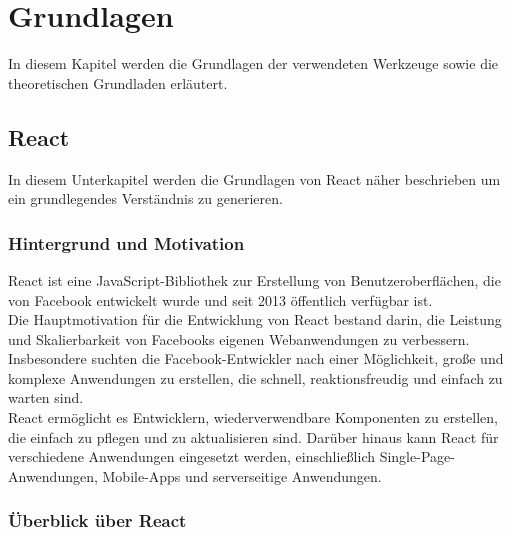 



\chapter{Grundlagen}
In diesem Kapitel werden die Grundlagen der verwendeten Werkzeuge sowie die theoretischen Grundladen erläutert.
\section{React}
In diesem Unterkapitel werden die Grundlagen von React näher beschrieben um ein grundlegendes Verständnis zu generieren.

\subsection{Hintergrund und Motivation}
React ist eine JavaScript-Bibliothek zur Erstellung von Benutzeroberflächen, die von Facebook entwickelt wurde und seit 2013 öffentlich verfügbar ist.\cite{ReactGettingStarted} \\Die Hauptmotivation für die Entwicklung von React bestand darin, die Leistung und Skalierbarkeit von Facebooks eigenen Webanwendungen zu verbessern. Insbesondere suchten die Facebook-Entwickler nach einer Möglichkeit, große und komplexe Anwendungen zu erstellen, die schnell, reaktionsfreudig und einfach zu warten sind.\\
React ermöglicht es Entwicklern, wiederverwendbare Komponenten zu erstellen, die einfach zu pflegen und zu aktualisieren sind. Darüber hinaus kann React für verschiedene Anwendungen eingesetzt werden, einschließlich Single-Page-Anwendungen, Mobile-Apps und serverseitige Anwendungen.

\subsection{Überblick über React}

